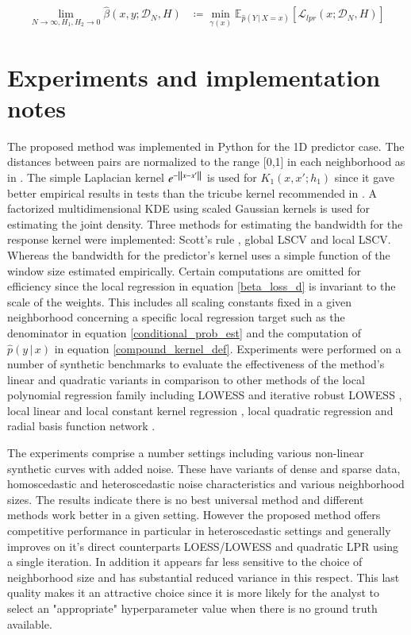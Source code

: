 \documentclass[preprint,1p,times]{elsarticle}
\begin{document}
\begin{align}
\lim_{N \rightarrow \infty, H_1, H_2 \rightarrow 0} \hat{\beta}(x,y ; \mathcal{D}_N , H) & \coloneqq \min_{\gamma(x)} \mathbb{E}_{\hat{p} (Y \, | \, X=x)} \left[   \mathcal{L}_{lpr}(x; \mathcal{D}_N,H) \right]
\end{align}


\section{Experiments and implementation notes}
\label{S:Experiments and implementation notes}
The proposed method was implemented in Python for the 1D predictor case. The distances between pairs are normalized to the range [0,1] in each neighborhood as in \citep{clevland79}. The simple Laplacian kernel $e^{- \, \norm{x-x'}}$ is used for $K_1(x,x';h_1)$ since it gave better empirical results in tests than the tricube kernel recommended in \citep{clevland79}. A factorized multidimensional KDE using scaled Gaussian kernels is used for estimating the joint density. Three methods for estimating the bandwidth for the response kernel were implemented: Scott's rule \cite{scott2015multivariate}, global LSCV and local LSCV. Whereas the bandwidth for the predictor's kernel uses a simple function of the window size estimated empirically. Certain computations are omitted for efficiency since the local regression in equation \eqref{beta_loss_d} is invariant to the scale of the weights. This includes all scaling constants fixed in a given neighborhood concerning a specific local regression target such as the denominator in equation \eqref{conditional_prob_est} and the computation of $\hat{p}(y \, | \, x)$ in equation \eqref{compound_kernel_def}. Experiments were performed on a number of synthetic benchmarks to evaluate the effectiveness of the method's linear and quadratic variants in comparison to other methods of the local polynomial regression family including LOWESS and iterative robust LOWESS \cite{seabold2010statsmodels}, local linear and local constant kernel regression \cite{seabold2010statsmodels}, local quadratic regression \cite{localreg} and radial basis function network \cite{localreg}. \newline

The experiments comprise a number settings including various non-linear synthetic curves with added noise. These have variants of dense and sparse data, homoscedastic and heteroscedastic noise characteristics and various neighborhood sizes. The results indicate there is no best universal method and different methods work better in a given setting. However the proposed method offers competitive performance in particular in heteroscedastic settings and generally improves on it's direct counterparts LOESS/LOWESS and quadratic LPR using a single iteration. In addition it appears far less sensitive to the choice of neighborhood size and has substantial reduced variance in this respect. This last quality makes it an attractive choice since it is more likely for the analyst to select an "appropriate" hyperparameter value when there is no ground truth available.
\end{document}
